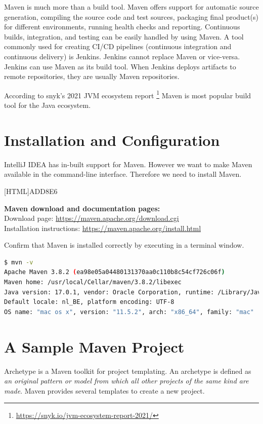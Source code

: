 Maven is much more than a build tool.  Maven offers support for automatic source generation,  compiling the source code and test sources, packaging final product(s) for different environments, running health checks and reporting.  Continuous builds, integration, and testing can be easily handled by using Maven. A tool commonly used for creating CI/CD pipelines (continuous integration and continuous delivery) is Jenkins.  Jenkins cannot replace Maven or vice-versa. Jenkins can use Maven as its build tool.  
When Jenkins deploys artifacts to remote repositories, they are usually Maven repositories. 

According to snyk's 2021 JVM ecosystem report \footnote{\url{https://snyk.io/jvm-ecosystem-report-2021/}} Maven is most popular build tool for the Java ecosystem.

\section{Installation and Configuration}

IntelliJ IDEA has in-built support for Maven.  However we want to make Maven available in the command-line interface. Therefore we need to install Maven. 

 [HTML]{ADD8E6}{\parbox{\textwidth}{%
\noindent \textbf{Maven download and documentation pages:}\\
Download page: \url{https://maven.apache.org/download.cgi}\\
Installation instructions: \url{https://maven.apache.org/install.html}
}}

Confirm that Maven is installed correctly by executing  in a terminal window. 

\begin{lstlisting}[language=bash, frame=single]
$ mvn -v
Apache Maven 3.8.2 (ea98e05a04480131370aa0c110b8c54cf726c06f)
Maven home: /usr/local/Cellar/maven/3.8.2/libexec
Java version: 17.0.1, vendor: Oracle Corporation, runtime: /Library/Java/JavaVirtualMachines/jdk-17.0.1.jdk/Contents/Home
Default locale: nl_BE, platform encoding: UTF-8
OS name: "mac os x", version: "11.5.2", arch: "x86_64", family: "mac"
\end{lstlisting}


\section{A Sample Maven Project}

Archetype is a Maven toolkit for project templating. An archetype is defined as \textit{an original pattern or model from which all other projects of the same kind are made}. Maven provides several templates to create a new project. 


